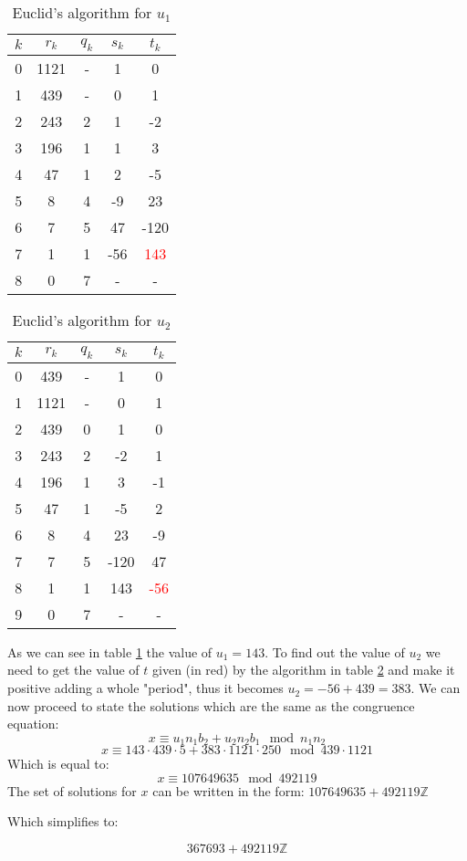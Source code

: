 \begin{enumerate}
\begin{table}[h!]
\centering
\begin{tabular}{|c||c|c||c|c|}
  \hline
$k$ & $r_k$ & $q_k$ & $s_k$ & $t_k$ \\
 \hline
 \hline
0 & 1121 & - & 1 & 0 \\
\hline
1 & 439 & - & 0 & 1 \\
\hline
2 & 243 & 2 & 1 & -2 \\
\hline
3 & 196 & 1 & 1 & 3 \\
\hline
4 & 47 & 1 & 2 & -5 \\
\hline
5 & 8 & 4 & -9 & 23 \\
\hline
6 & 7 & 5 & 47 & -120 \\
\hline
7 & 1 & 1 & -56 & \textcolor{red}{143} \\
\hline
8 & 0 & 7 & - & - \\
\hline
\end{tabular}
\caption{Euclid's algorithm for $u_1$}
\label{TabU1}
\end{table} 
\newpage
\begin{table}[h!]
\centering
\begin{tabular}{|c||c|c||c|c|}
  \hline
$k$ & $r_k$ & $q_k$ & $s_k$ & $t_k$ \\
 \hline
 \hline
0 & 439 & - & 1 & 0 \\
\hline
1 & 1121 & - & 0 & 1 \\
\hline
2 & 439 & 0 & 1 & 0 \\
\hline
3 & 243 & 2 & -2 & 1 \\
\hline
4 & 196 & 1 & 3 & -1 \\
\hline
5 & 47 & 1 & -5 & 2 \\
\hline
6 & 8 & 4 & 23 & -9 \\
\hline
7 & 7 & 5 & -120 & 47 \\
\hline
8 & 1 & 1 & 143 & \textcolor{red}{-56} \\
\hline
9 & 0 & 7 & - & - \\
\hline
\end{tabular}
\caption{Euclid's algorithm for $u_2$}
\label{TabU2}
\end{table} 
As we can see in table \ref{TabU1} the value of $ u_1 = 143 $. To find out the value of $ u_2 $ we need to get the value of $ t $ given (in red) by the algorithm in table \ref{TabU2} and make it positive adding a whole "period", thus it becomes $ u_2 = -56 + 439 = 383 $. We can now proceed to state the solutions which are the same as the congruence equation:
\[ x \equiv u_1 n_1 b_2 + u_2 n_2 b_1 \mod n_1 n_2 \]
\[ x \equiv 143\cdot 439 \cdot 5 + 383 \cdot 1121 \cdot 250 \mod 439 \cdot 1121 \]
Which is equal to:
\[ x \equiv 107649635 \mod 492119 \]
The set of solutions for $ x $ can be written in the form: $107649635 + 492119 \mathbb{Z}$

Which simplifies to:

\begin{equation}
    367693 + 492119 \mathbb{Z}
\end{equation}

\end{enumerate}